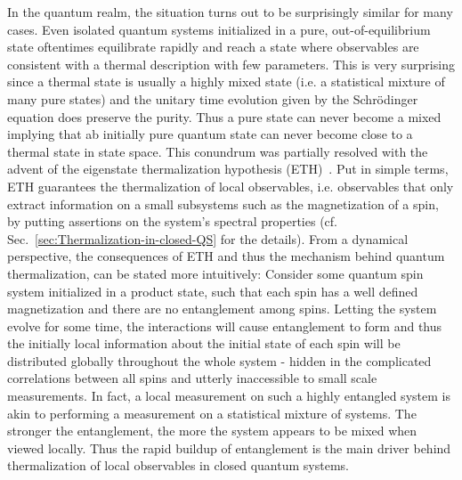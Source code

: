 
In the quantum realm, the situation turns out to be surprisingly similar for many cases. Even isolated quantum systems initialized in a pure, out-of-equilibrium state oftentimes equilibrate rapidly and reach a state where observables are consistent with a thermal description with few parameters. This is very surprising since a thermal state is usually a highly mixed state (i.e. a statistical mixture of many pure states) and the unitary time evolution given by the Schrödinger equation does preserve the purity. Thus a pure state can never become a mixed implying that ab initially pure quantum state can never become close to a thermal state in state space. This conundrum was partially resolved with the advent of the eigenstate thermalization hypothesis (ETH)~\cite{deutschQuantumStatisticalMechanics1991,srednickiChaosQuantumThermalization1994, deutschEigenstateThermalizationHypothesis2018}. Put in simple terms, ETH guarantees the thermalization of local observables, i.e. observables that only extract information on a small subsystems such as the magnetization of a spin, by putting assertions on the system's spectral properties (cf. Sec.~\ref{sec:Thermalization-in-closed-QS} for the details). 
From a dynamical perspective, the consequences of ETH and thus the mechanism behind quantum thermalization, can be stated more intuitively: Consider some quantum spin system initialized in a product state, such that each spin has a well defined magnetization and there are no entanglement among spins. Letting the system evolve for some time, the interactions will cause entanglement to form and thus the initially local information about the initial state of each spin will be distributed globally throughout the whole system - hidden in the complicated correlations between all spins and utterly inaccessible to small scale measurements. In fact, a local measurement on such a highly entangled system is akin to performing a measurement on a statistical mixture of systems. The stronger the entanglement, the more the system appears to be mixed when viewed locally.
Thus the rapid buildup of entanglement is the main driver behind thermalization of local observables in closed quantum systems.


